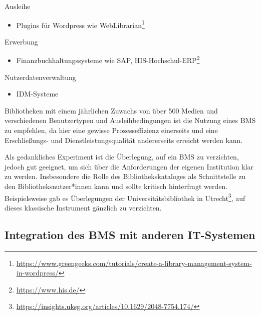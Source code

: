 \documentclass[
  11pt,
  letterpaper,
  DIV=11,
  twoside]{scrreprt}
\providecommand{\tightlist}{%
  \setlength{\itemsep}{0pt}\setlength{\parskip}{0pt}}\usepackage{longtable,booktabs,array}
\DeclareRobustCommand{\href}[2]{#2\footnote{\url{#1}}}
\begin{document}
Ausleihe

\begin{itemize}
\tightlist
\item
  Plugins für Wordpress wie
  \href{https://www.greengeeks.com/tutorials/create-a-library-management-system-in-wordpress/}{WebLibrarian}
\end{itemize}

Erwerbung

\begin{itemize}
\tightlist
\item
  Finanzbuchhaltungssysteme wie SAP,
  \href{https://www.his.de/}{HIS-Hochschul-ERP}
\end{itemize}

Nutzerdatenverwaltung

\begin{itemize}
\tightlist
\item
  IDM-Systeme
\end{itemize}

Bibliotheken mit einem jährlichen Zuwachs von über 500 Medien und
verschiedenen Benutzertypen und Ausleihbedingungen ist die Nutzung eines
BMS zu empfehlen, da hier eine gewisse Prozesseffizienz einerseits und
eine Erschließungs- und Dienstleistungsqualität andererseits erreicht
werden kann.

\begin{tcolorbox}[enhanced jigsaw, leftrule=.75mm, toprule=.15mm, left=2mm, opacityback=0, arc=.35mm, colback=white, breakable, colframe=quarto-callout-tip-color-frame, rightrule=.15mm, bottomrule=.15mm]
\begin{minipage}[t]{5.5mm}
\textcolor{quarto-callout-tip-color}{\faLightbulb}
\end{minipage}%
\begin{minipage}[t]{\textwidth - 5.5mm}

Als gedankliches Experiment ist die Überlegung, auf ein BMS zu
verzichten, jedoch gut geeignet, um sich über die Anforderungen der
eigenen Institution klar zu werden. Insbesondere die Rolle des
Bibliothekskataloges als Schnittstelle zu den Bibliotheksnutzer*innen
kann und sollte kritisch hinterfragt werden. Beispielsweise gab es
\href{https://insights.uksg.org/articles/10.1629/2048-7754.174/}{Überlegungen
der Universitätsbibliothek in Utrecht}, auf dieses klassische Instrument
gänzlich zu verzichten.

\end{minipage}%
\end{tcolorbox}

\subsection{Integration des BMS mit anderen
IT-Systemen}\label{integration}
\end{document}
